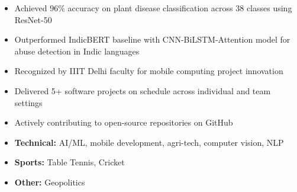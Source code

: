 \documentclass[10pt]{extarticle}
\begin{document}
\vspace{8pt}

\begin{contained}
\begin{itemize}
    \item Achieved 96\% accuracy on plant disease classification across 38 classes using ResNet-50
    \item Outperformed IndicBERT baseline with CNN-BiLSTM-Attention model for abuse detection in Indic languages
    \item Recognized by IIIT Delhi faculty for mobile computing project innovation
    \item Delivered 5+ software projects on schedule across individual and team settings
    \item Actively contributing to open-source repositories on GitHub
\end{itemize}
\end{contained}

\vspace{8pt}

\begin{contained}
\begin{itemize}
    \item \textbf{Technical:} AI/ML, mobile development, agri-tech, computer vision, NLP
    \item \textbf{Sports:} Table Tennis, Cricket
    \item \textbf{Other:} Geopolitics
\end{itemize}
\end{contained}
\end{document}
